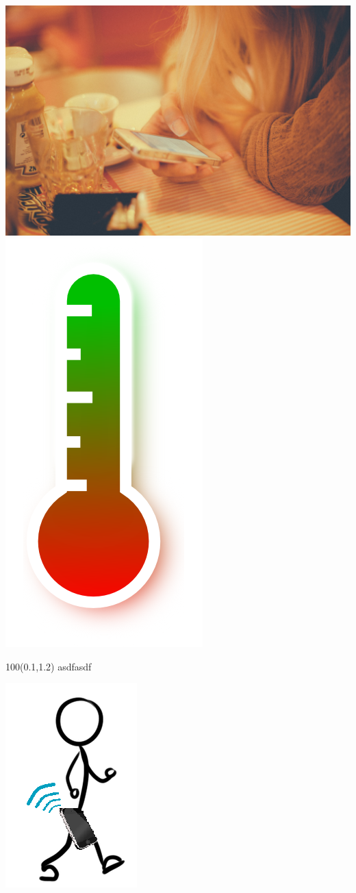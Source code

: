 \documentclass{beamer}
\begin{document}
\begin{block}{}
	\includegraphics[scale=0.1]{smartphonewoman}
	\includegraphics[scale=1.5]{red-to-green-gradient-thermometer-hi}
\end{block}

\begin{textblock}{100}(0.1,1.2)
	asdfasdf
\end{textblock}

\begin{block}{}
	\includegraphics[scale=1.5]{walk}
\end{block}
\end{document}
